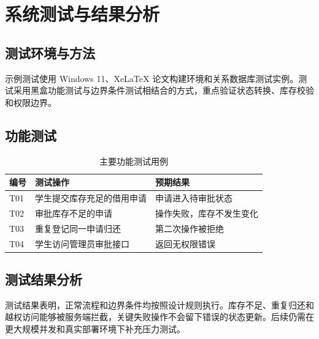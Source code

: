 \chapter{系统测试与结果分析}
\section{测试环境与方法}
示例测试使用 Windows 11、XeLaTeX 论文构建环境和关系数据库测试实例。测试采用黑盒功能测试与边界条件测试相结合的方式，重点验证状态转换、库存校验和权限边界。
\section{功能测试}
\begingroup{}\setlength{\tabcolsep}{3pt}\renewcommand{\arraystretch}{1.25}
\begin{longtable}{|>{\RaggedRight\arraybackslash}p{}|>{\RaggedRight\arraybackslash}p{}|>{\RaggedRight\arraybackslash}p{}|}
\caption{主要功能测试用例}\label{tab:5-1}\\\hline
\textbf{编号} & \textbf{测试操作} & \textbf{预期结果} \\\hline
\endfirsthead
T01 & 学生提交库存充足的借用申请 & 申请进入待审批状态 \\\hline
T02 & 审批库存不足的申请 & 操作失败，库存不发生变化 \\\hline
T03 & 重复登记同一申请归还 & 第二次操作被拒绝 \\\hline
T04 & 学生访问管理员审批接口 & 返回无权限错误 \\\hline
\end{longtable}\endgroup
\section{测试结果分析}
测试结果表明，正常流程和边界条件均按照设计规则执行。库存不足、重复归还和越权访问能够被服务端拦截，关键失败操作不会留下错误的状态更新。后续仍需在更大规模并发和真实部署环境下补充压力测试。
